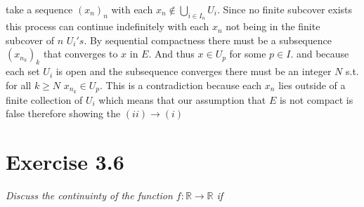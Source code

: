 \documentclass{amsart}
\begin{document}
\begin{enumerate}
            take a sequence $(x_n)_n$ with each $x_n \not\in \bigcup_{i \in I_n} U_i$. Since no finite subcover exists this process can continue indefinitely with each $x_n$ not being in the finite subcover of $n$ $U_i's$.
            By sequential compactness there must be a subsequence  $(x_{n_k})_k$ that converges to $x$ in $E$. And thus $x \in U_p$ for some $p \in I$. and because each set $U_i$ is open and the subsequence converges there must
            be an integer $N$ s.t. for all $k \ge N$ $x_{n_k} \in U_p$. This is a contradiction because each $x_n$ lies outside of a finite collection of $U_i$ which means that our assumption that $E$ is not compact is false therefore
            showing the $(ii) \rightarrow (i)$

    \end{enumerate}
    \section{Exercise 3.6}
    \emph{Discuss the continuinty of the function $f : \mathbb{R} \rightarrow \mathbb{R} $ if}
\end{document}
